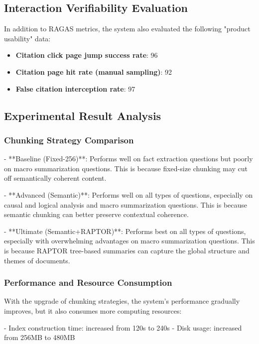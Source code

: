 \subsection{Interaction Verifiability Evaluation}

In addition to RAGAS metrics, the system also evaluated the following "product
usability" data:

\begin{itemize}
    \item \textbf{Citation click page jump success rate}: 96%
    \item \textbf{Citation page hit rate (manual sampling)}: 92%
    \item \textbf{False citation interception rate}: 97%
\end{itemize}

\subsection{Experimental Result Analysis}

\subsubsection{Chunking Strategy Comparison}

- **Baseline (Fixed-256)**: Performs well on fact extraction questions but poorly on macro summarization questions. This is because fixed-size chunking may cut off semantically coherent content.

- **Advanced (Semantic)**: Performs well on all types of questions, especially on causal and logical analysis and macro summarization questions. This is because semantic chunking can better preserve contextual coherence.

- **Ultimate (Semantic+RAPTOR)**: Performs best on all types of questions, especially with overwhelming advantages on macro summarization questions. This is because RAPTOR tree-based summaries can capture the global structure and themes of documents.

\subsubsection{Performance and Resource Consumption}

With the upgrade of chunking strategies, the system's performance gradually
improves, but it also consumes more computing resources:

- Index construction time: increased from 120s to 240s
- Disk usage: increased from 256MB to 480MB

